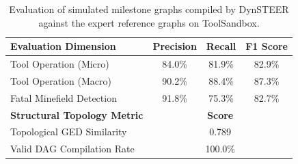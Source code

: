 \begin{table}[t]
\centering
\small
\caption{Evaluation of simulated milestone graphs compiled by DynSTEER against the expert reference graphs on ToolSandbox.}
\label{tab:milestone_gen}
\vspace{0.15cm}
\begin{tabular}{lccc}
\toprule
\textbf{Evaluation Dimension} & \textbf{Precision} & \textbf{Recall} & \textbf{F1 Score} \\
\midrule
Tool Operation (Micro) & 84.0\% & 81.9\% & 82.9\% \\
Tool Operation (Macro) & 90.2\% & 88.4\% & 87.3\% \\
Fatal Minefield Detection & 91.8\% & 75.3\% & 82.7\% \\
\midrule
\textbf{Structural Topology Metric} & \multicolumn{3}{c}{\textbf{Score}} \\
\midrule
Topological GED Similarity & \multicolumn{3}{c}{0.789} \\
Valid DAG Compilation Rate & \multicolumn{3}{c}{100.0\%} \\
\bottomrule
\end{tabular}
\end{table}
